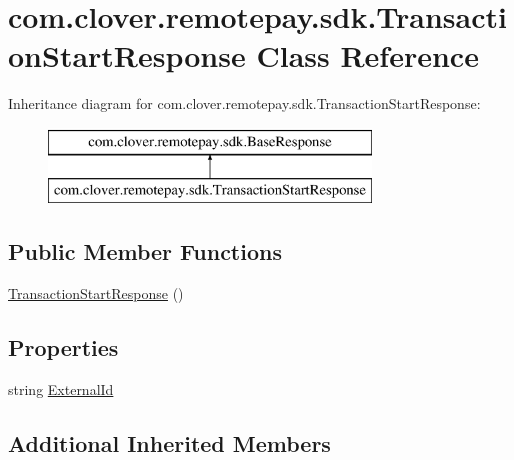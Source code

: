 \hypertarget{classcom_1_1clover_1_1remotepay_1_1sdk_1_1_transaction_start_response}{}\section{com.\+clover.\+remotepay.\+sdk.\+Transaction\+Start\+Response Class Reference}
\label{classcom_1_1clover_1_1remotepay_1_1sdk_1_1_transaction_start_response}


 


Inheritance diagram for com.\+clover.\+remotepay.\+sdk.\+Transaction\+Start\+Response\+:\begin{figure}[H]
\begin{center}
\leavevmode
\includegraphics[height=2.000000cm]{classcom_1_1clover_1_1remotepay_1_1sdk_1_1_transaction_start_response}
\end{center}
\end{figure}
\subsection*{Public Member Functions}
\begin{DoxyCompactItemize}
\item 
\hyperlink{classcom_1_1clover_1_1remotepay_1_1sdk_1_1_transaction_start_response_a4d118e305c09d75ac869f37dbb80ed76}{Transaction\+Start\+Response} ()
\end{DoxyCompactItemize}
\subsection*{Properties}
\begin{DoxyCompactItemize}
\item 
string \hyperlink{classcom_1_1clover_1_1remotepay_1_1sdk_1_1_transaction_start_response_af54046ae8db8d5dcf7c40cf12b076ee0}{External\+Id}
\end{DoxyCompactItemize}
\subsection*{Additional Inherited Members}



